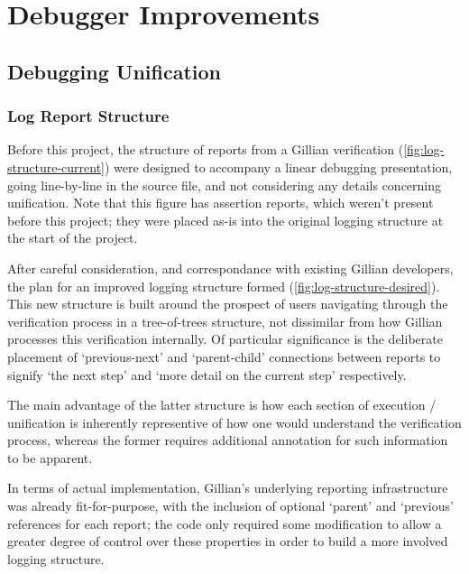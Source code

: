 
\chapter{Debugger Improvements}\label{sec:improvements}

\section{Debugging Unification}\label{sec:improvements:unification_debug}

\subsection{Log Report Structure}\label{sec:improvements:unification_debug:log_structure}

Before this project, the structure of reports from a Gillian verification
(\autoref{fig:log-structure-current}) were designed to accompany a linear
debugging presentation, going line-by-line in the source file, and not
considering any details concerning unification. Note that this figure has
assertion reports, which weren't present before this project; they were placed
as-is into the original logging structure at the start of the project.

After careful consideration, and correspondance with existing Gillian
developers, the plan for an improved logging structure formed
(\autoref{fig:log-structure-desired}). This new structure is built around the
prospect of users navigating through the verification process in a tree-of-trees
structure, not dissimilar from how Gillian processes this verification
internally. Of particular significance is the deliberate placement of
`previous-next' and `parent-child' connections between reports to signify
`the next step' and `more detail on the current step' respectively.

The main advantage of the latter structure is how each section of execution /
unification is inherently representive of how one would understand the
verification process, whereas the former requires additional annotation for
such information to be apparent.

In terms of actual implementation, Gillian's underlying reporting infrastructure
was already fit-for-purpose, with the inclusion of optional `parent' and
`previous' references for each report; the code only required some modification
to allow a greater degree of control over these properties in order to build a
more involved logging structure.

